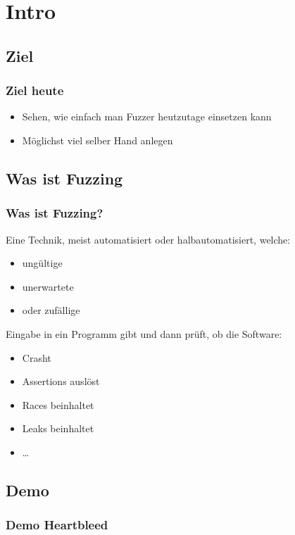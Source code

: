 \section{Intro}

\subsection{Ziel}
\begin{frame}[fragile]
	\frametitle{Ziel heute}

	\begin{itemize}
		\item Sehen, wie einfach man Fuzzer heutzutage einsetzen kann
		\item Möglichst viel selber Hand anlegen
	\end{itemize}
\end{frame}


\subsection{Was ist Fuzzing}
\begin{frame}[fragile]
	\frametitle{Was ist Fuzzing?}

	Eine Technik, meist automatisiert oder halbautomatisiert, welche:
	\pause\
	\begin{itemize}
		\item ungültige
		\item unerwartete
		\item oder zufällige
	\end{itemize}
	Eingabe in ein Programm gibt und dann prüft, ob die Software:
	\pause\
	\begin{itemize}
		\item Crasht
		\item Assertions auslöst
		\item Races beinhaltet
		\item Leaks beinhaltet
		\item \ldots
	\end{itemize}
\end{frame}

\subsection{Demo}
\begin{frame}[fragile]
	\frametitle{Demo Heartbleed}
	
\end{frame}

